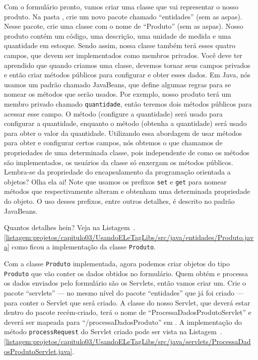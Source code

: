 Com o formulário pronto, vamos criar uma classe que vai representar o nosso produto. Na pasta , crie um novo pacote chamado ``entidades'' (sem as aspas). Nesse pacote, crie uma classe com o nome de ``Produto'' (sem as aspas). Nosso produto contém um código, uma descrição, uma unidade de medida e uma quantidade em estoque. Sendo assim, nossa classe também terá esses quatro campos, que devem ser implementados como membros privados. Você deve ter aprendido que quando criamos uma classe, devemos tornar seus campos privados e então criar métodos públicos para configurar e obter esses dados. Em Java, nós usamos um padrão chamado JavaBeans, que define algumas regras para se nomear os métodos que serão usados. Por exemplo, nosso produto terá um membro privado chamado \texttt{quantidade}, então teremos dois métodos públicos para acessar esse campo. O método  (configure a quantidade) será usado para configurar a quantidade, enquanto o método  (obtenha a quantidade) será usado para obter o valor da quantidade. Utilizando essa abordagem de usar métodos para obter e configurar certos campos, nós obtemos o que chamamos de propriedades de uma determinada classe, pois independente de como os métodos são implementados, os usuários da classe só enxergam os métodos públicos. Lembra-se da propriedade do encapsulamento da programação orientada a objetos? Olha ela ai! Note que usamos os prefixos \texttt{set} e \texttt{get} para nomear métodos que respectivamente alteram e obtenham uma determinada propriedade do objeto. O uso desses prefixos, entre outros detalhes, é descrito no padrão JavaBeans.

Quantos detalhes hein? Veja na Listagem~\thechapter.\ref{listagem:projetos/capitulo03/UsandoELeTagLibs/src/java/entidades/Produto.java} como ficou a implementação da classe \texttt{Produto}.


Com a classe \texttt{Produto} implementada, agora podemos criar objetos do tipo \texttt{Produto} que vão conter os dados obtidos no formulário. Quem obtém e processa os dados enviados pelo formulário são os Servlets, então vamos criar um. Crie o pacote ``servlets'' --- no mesmo nível do pacote ``entidades'' que já foi criado --- para conter o Servlet que será criado. A classe do nosso Servlet, que deverá estar dentro do pacote recém-criado, terá o nome de ``ProcessaDadosProdutoServlet'' e deverá ser mapeada para ``/processaDadosProduto'' em . A implementação do método \texttt{processRequest} do Servlet criado pode ser vista na Listagem~\thechapter.\ref{listagem:projetos/capitulo03/UsandoELeTagLibs/src/java/servlets/ProcessaDadosProdutoServlet.java}.

